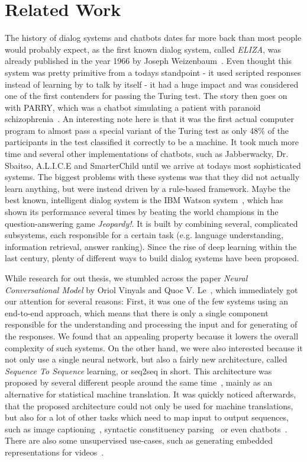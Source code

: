 \chapter{Related Work}
\label{related_work}

The history of dialog systems and chatbots dates far more back than most people would probably expect, as the first known dialog system, called \emph{ELIZA}, was already published in the year 1966 by Joseph Weizenbaum~\cite{Weizenbaum:1966}. Even thought this system was pretty primitive from a todays standpoint - it used scripted responses instead of learning by to talk by itself - it had a huge impact and was considered one of the first contenders for passing the Turing test. The story then goes on with PARRY, which was a chatbot simulating a patient with paranoid schizophrenia~\cite{Colby:1974}. An interesting note here is that it was the first actual computer program to almost pass a special variant of the Turing test as only 48\% of the participants in the test classified it correctly to be a machine. It took much more time and several other implementations of chatbots, such as Jabberwacky, Dr. Sbaitso, A.L.I.C.E and SmarterChild until we arrive at todays most sophisticated systems. The biggest problems with these systems was that they did not actually learn anything, but were instead driven by a rule-based framework. Maybe the best known, intelligent dialog system is the IBM Watson system~\cite{Ferrucci:2012}, which has shown its performance several times by beating the world champions in the question-answering game \emph{Jeopardy!}. It is built by combining several, complicated subsystems, each responsible for a certain task (e.g. language understanding, information retrieval, answer ranking). Since the rise of deep learning within the last century, plenty of different ways to build dialog systems have been proposed.

While research for out thesis, we stumbled across the paper \emph{Neural Conversational Model} by Oriol Vinyals and Quoc V. Le~\cite{Vinyals:2015}, which immediately got our attention for several reasons: First, it was one of the few systems using an end-to-end approach, which means that there is only a single component responsible for the understanding and processing the input and for generating of the responses. We found that an appealing property because it lowers the overall complexity of such systems. On the other hand, we were also interested because it not only use a single neural network, but also a fairly new architecture, called \emph{Sequence To Sequence} learning, or seq2seq in short. This architecture was proposed by several different people around the same time~\cite{Sutskever:2014}\cite{Kalchbrenner:2013}\cite{Cho:2014}, mainly as an alternative for statistical machine translation. It was quickly noticed afterwards, that the proposed architecture could not only be used for machine translations, but also for a lot of other tasks which need to map input to output sequences, such as image captioning~\cite{Xu:2015}, syntactic constituency parsing~\cite{Vinyals:2015:Foreign} or even chatbots~\cite{Zivkovic:Trumpbot}\cite{Lison:2016}. There are also some unsupervised use-cases, such as generating embedded representations for videos~\cite{Nitish:2015}.

